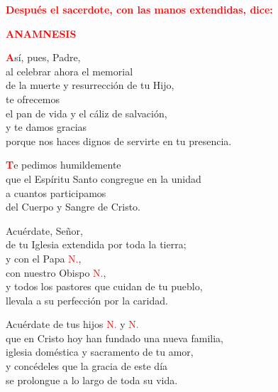 \documentclass[12pt, letterpaper, spanish]{report}
\begin{document}
\large{\bfseries \textcolor{red}{Despu\'es el sacerdote, con las manos extendidas, dice:}}\newline

\Large {\bfseries \textcolor{red}{ANAMNESIS}} \newline

\Large \lettrine{\bfseries \textcolor{red}{A}}{}s\'i, pues, Padre,\\
al celebrar ahora el memorial\\
de la muerte y resurrecci\'on de tu Hijo,\\
te ofrecemos\\ 
el pan de vida y el c\'aliz de salvaci\'on,\\
y te damos gracias\\
porque nos haces dignos de servirte en tu presencia.\newline

\lettrine{\bfseries \textcolor{red}{T}}{}e pedimos humildemente\\
que el Esp\'iritu Santo congregue en la unidad\\
a cuantos participamos\\
del Cuerpo y Sangre de Cristo.\newline

Acu\'erdate, Se\~nor,\\ 
de tu Iglesia extendida por toda la tierra; \\
y con el Papa \textcolor{red}{N.},\\
con nuestro Obispo \textcolor{red}{N.},\\
y todos los pastores que cuidan de tu pueblo,\\
llevala a su perfecci\'on por la caridad.\newline

Acu\'erdate de tus hijos \textcolor{red}{N.} y \textcolor{red}{N.} \\
que en Cristo hoy han fundado una nueva familia, \\
iglesia dom\'estica y sacramento de tu amor, \\
y conc\'edeles que la gracia de este d\'ia \\
se prolongue a lo largo de toda su vida.\newline
\end{document}
